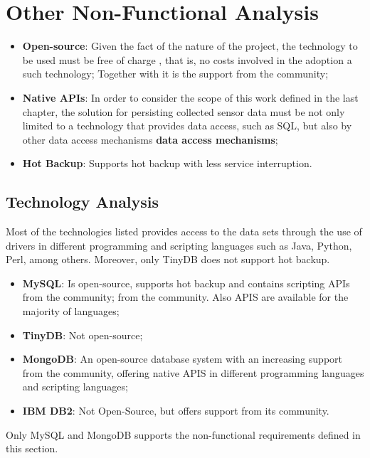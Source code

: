 \section{Other Non-Functional Analysis}

\begin{itemize}
  \item \textbf{Open-source}: Given the fact of the nature of the project, the
  technology to be used must be free of charge \cite{open-source}, that is, no
  costs involved in the adoption a such technology; Together with it is the
  support from the community;
  \item \textbf{Native APIs}: In order to consider the scope of this work
  defined in the last chapter, the solution for persisting collected sensor
  data must be not only limited to a technology that provides data access, such
  as SQL, but also by other data access mechanisms \textbf{data access
  mechanisms};
  \item \textbf{Hot Backup}: Supports hot backup with less service interruption. 
\end{itemize}

\subsection{Technology Analysis}

Most of the technologies listed provides access to the data sets through the
use of drivers in different programming and scripting languages such as Java,
Python, Perl, among others. Moreover, only TinyDB does not support hot backup.

\begin{itemize}
  \item \textbf{MySQL}: Is  open-source, supports hot backup and contains
  scripting APIs from  the community;
  from the community. Also APIS are available for the majority of languages;
  \item \textbf{TinyDB}: Not open-source;
  \item \textbf{MongoDB}: An open-source database system with an increasing
  support from  the community, offering native APIS in different programming
  languages and scripting languages;
  \item \textbf{IBM DB2}: Not Open-Source, but offers support from its
  community.
\end{itemize}

Only MySQL and MongoDB supports the non-functional requirements defined in this
section.

